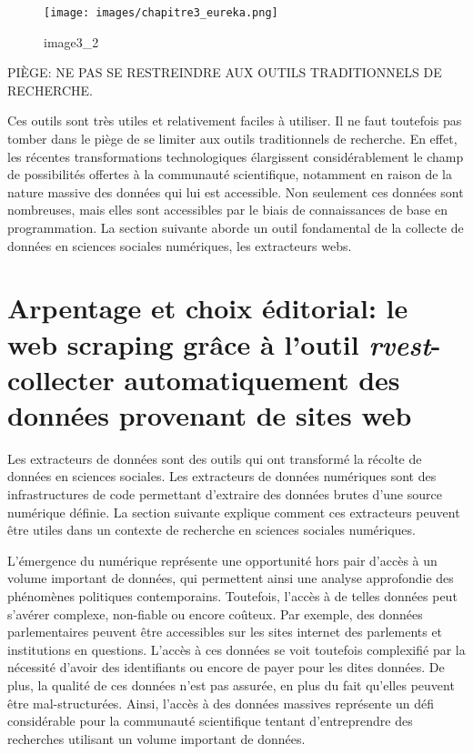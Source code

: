 \documentclass[
  letterpaper,
  DIV=11,
  numbers=noendperiod]{scrreprt}
\begin{document}
\begin{figure}

{\centering \texttt{[image: images/chapitre3\_eureka.png]}

}

\caption{image3\_2}

\end{figure}

PIÈGE: NE PAS SE RESTREINDRE AUX OUTILS TRADITIONNELS DE RECHERCHE.

Ces outils sont très utiles et relativement faciles à utiliser. Il ne
faut toutefois pas tomber dans le piège de se limiter aux outils
traditionnels de recherche. En effet, les récentes transformations
technologiques élargissent considérablement le champ de possibilités
offertes à la communauté scientifique, notamment en raison de la nature
massive des données qui lui est accessible. Non seulement ces données
sont nombreuses, mais elles sont accessibles par le biais de
connaissances de base en programmation. La section suivante aborde un
outil fondamental de la collecte de données en sciences sociales
numériques, les extracteurs webs.

\hypertarget{arpentage-et-choix-uxe9ditorial-le-web-scraping-gruxe2ce-uxe0-loutil-rvest--collecter-automatiquement-des-donnuxe9es-provenant-de-sites-web}{%
\section{\texorpdfstring{\textbf{Arpentage et choix éditorial: le web
scraping grâce à l'outil \emph{rvest}- collecter automatiquement des
données provenant de sites
web}}{Arpentage et choix éditorial: le web scraping grâce à l'outil rvest- collecter automatiquement des données provenant de sites web}}\label{arpentage-et-choix-uxe9ditorial-le-web-scraping-gruxe2ce-uxe0-loutil-rvest--collecter-automatiquement-des-donnuxe9es-provenant-de-sites-web}}

Les extracteurs de données sont des outils qui ont transformé la récolte
de données en sciences sociales. Les extracteurs de données numériques
sont des infrastructures de code permettant d'extraire des données
brutes d'une source numérique définie. La section suivante explique
comment ces extracteurs peuvent être utiles dans un contexte de
recherche en sciences sociales numériques.

L'émergence du numérique représente une opportunité hors pair d'accès à
un volume important de données, qui permettent ainsi une analyse
approfondie des phénomènes politiques contemporains. Toutefois, l'accès
à de telles données peut s'avérer complexe, non-fiable ou encore
coûteux. Par exemple, des données parlementaires peuvent être
accessibles sur les sites internet des parlements et institutions en
questions. L'accès à ces données se voit toutefois complexifié par la
nécessité d'avoir des identifiants ou encore de payer pour les dites
données. De plus, la qualité de ces données n'est pas assurée, en plus
du fait qu'elles peuvent être mal-structurées. Ainsi, l'accès à des
données massives représente un défi considérable pour la communauté
scientifique tentant d'entreprendre des recherches utilisant un volume
important de données.
\end{document}
